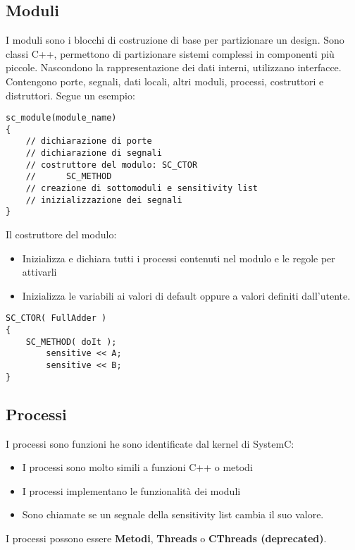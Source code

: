 \documentclass[a4paper]{article}
\theoremstyle{definition}
\begin{document}
		\subsection{Moduli}
			I moduli sono i blocchi di costruzione di base per partizionare un design. Sono classi C++, permettono di partizionare sistemi complessi in componenti più piccole. Nascondono la rappresentazione dei dati interni, utilizzano interfacce. Contengono porte, segnali, dati locali, altri moduli, processi, costruttori e distruttori. Segue un esempio:
		
			\begin{lstlisting}[mathescape, frame=tb, caption={module}]
sc_module(module_name)
{
	// dichiarazione di porte
	// dichiarazione di segnali
	// costruttore del modulo: SC_CTOR
	//		SC_METHOD
	// creazione di sottomoduli e sensitivity list
	// inizializzazione dei segnali
}
			\end{lstlisting}
	
		\noindent
		Il costruttore del modulo:
		\begin{itemize}
			\item Inizializza e dichiara tutti i processi contenuti nel modulo e le regole per attivarli
			\item Inizializza le variabili ai valori di default oppure a valori definiti dall'utente.
		\end{itemize}
		
		\begin{lstlisting}[mathescape, frame=tb, caption={full adder constructor}]
SC_CTOR( FullAdder )
{
	SC_METHOD( doIt );
		sensitive << A;
		sensitive << B;
}
		\end{lstlisting}
		
		\subsection{Processi}
			I processi sono funzioni he sono identificate dal kernel di SystemC:
			\begin{itemize}
				\item I processi sono molto simili a funzioni C++ o metodi
				\item I processi implementano le funzionalità dei moduli
				\item Sono chiamate se un segnale della sensitivity list cambia il suo valore.
			\end{itemize}
			
			\noindent
			I processi possono essere \textbf{Metodi}, \textbf{Threads} o \textbf{CThreads (deprecated)}.
			
\end{document}
